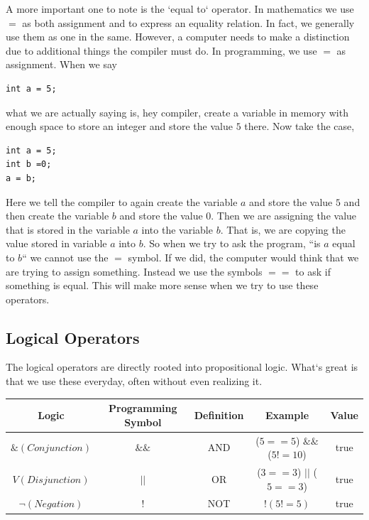 \documentclass[11]{article}
\begin{document}
A more important one to note is the 	`equal to` operator. In mathematics we use $=$ as both assignment and to express an equality relation. In fact, we generally use them as one in the same. However, a computer needs to make a distinction due to additional things the compiler must do. In programming, we use $=$ as assignment. When we say 
\begin{lstlisting}
int a = 5;
\end{lstlisting}
what we are actually saying is, hey compiler, create a variable in memory with enough space to store an integer and store the value $5$ there. Now take the case, 
\begin{lstlisting}
int a = 5;
int b =0;
a = b;
\end{lstlisting}

Here we tell the compiler to again create the variable $a$ and store the value $5$ and then create the variable $b$ and store the value $0$. Then we are assigning the value that is stored in the variable $a$ into the variable $b$. That is, we are copying the value stored in variable $a$ into $b$. So when we try to ask the program, ``is $a$ equal to $b$`` we cannot use the $=$ symbol. If we did, the computer would think that we are trying to assign something. Instead we use the symbols $==$ to ask if something is equal. This will make more sense when we try to use these operators.\\

\subsection{Logical Operators}
The logical operators are directly rooted into propositional logic. What`s great is that we use these everyday, often without even realizing it.

\begin{center}
  \begin{tabular}{ | c | c | c | c | c |}
    \hline
    Logic & Programming Symbol & Definition & Example & Value \\ \hline
    $\& (Conjunction)$ & $\&\&$ & AND & ($5==5$) $\&\&$ ($5!=10$) & true \\ \hline
    $V (Disjunction)$ & $||$ & OR & ($3==3$) $||$ ($5==3$) & true \\ \hline
    $\lnot (Negation)$ & $!$ & NOT &  $!(5 != 5)$ & true \\ 
    \hline
  \end{tabular}
\end{center}
\end{document}
